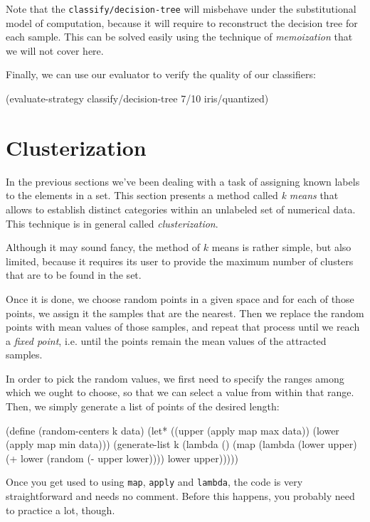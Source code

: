 Note that the \texttt{classify/decision-tree} will
misbehave under the substitutional model of computation,
because it will require to reconstruct the decision tree
for each sample. This can be solved easily using the
technique of \textit{memoization} that we will not cover
here.

Finally, we can use our evaluator to verify the quality
of our classifiers:

\begin{Snippet}
(evaluate-strategy classify/decision-tree 7/10 iris/quantized)
\end{Snippet}

\section{Clusterization}
In the previous sections we've been dealing with a task
of assigning known labels to the elements in a set. This
section presents a method called \textit{k means} that
allows to establish distinct categories within an unlabeled
set of numerical data. This technique is in general called
\textit{clusterization}.

Although it may sound fancy, the method of $k$ means is
rather simple, but also limited, because it requires its
user to provide the maximum number of clusters that are
to be found in the set.

Once it is done, we choose random points in a given space
and for each of those points, we assign it the samples that
are the nearest. Then we replace the random points with
mean values of those samples, and repeat that process
until we reach a \textit{fixed point}, i.e. until the
points remain the mean values of the attracted samples.

In order to pick the random values, we first need to
specify the ranges among which we ought to choose, so
that we can select a value from within that range.
Then, we simply generate a list of points of the desired
length:

\begin{Snippet}
(define (random-centers k data)
  (let* ((upper (apply map max data))
	 (lower (apply map min data)))
    (generate-list k (lambda ()
		       (map (lambda (lower upper)
			      (+ lower (random (- upper lower))))
			    lower
			    upper)))))
\end{Snippet}

Once you get used to using \texttt{map}, \texttt{apply} and
\texttt{lambda}, the code is very straightforward and needs
no comment. Before this happens, you probably need to practice
a lot, though.

